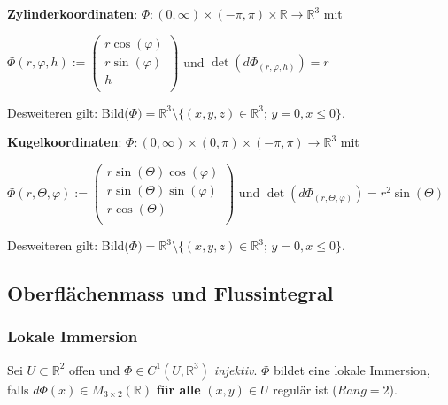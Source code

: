 \documentclass[a4paper, fontsize = 8pt, landscape]{scrartcl}
\newcommand{\R}[0]{\mathbb{R}}
\begin{document}
\begin{multicols*}{3}
    \textbf{Zylinderkoordinaten}: $\Phi: (0, \infty) \times (-\pi,\pi) \times \R \to \R^3$ mit

    \begin{center}
        $\Phi(r, \varphi, h) := \begin{pmatrix}
                r \cos(\varphi) \\ r \sin(\varphi) \\ h \\
            \end{pmatrix}$ \quad und \quad $\det(d\Phi_{(r, \varphi,h)}) = r$
    \end{center}

    Desweiteren gilt: Bild($\Phi) = \R^3 \setminus \{(x,y,z) \in \R^3; \, y = 0, x \leq 0\}$. \medskip

    \textbf{Kugelkoordinaten}: $\Phi: (0, \infty) \times (0,\pi) \times (-\pi,\pi) \to \R^3$ mit

    \begin{center}
        $\Phi(r, \Theta, \varphi) := \begin{pmatrix}
                r \sin(\Theta) \cos(\varphi) \\ r \sin(\Theta) \sin(\varphi) \\ r \cos(\Theta) \\
            \end{pmatrix}$ \quad und \quad $\det(d\Phi_{(r, \Theta, \varphi)}) = r^2 \sin(\Theta)$
    \end{center}

    Desweiteren gilt: Bild($\Phi) = \R^3 \setminus \{(x,y,z) \in \R^3; \, y = 0, x \leq 0\}$.






    \subsection{Oberflächenmass und Flussintegral}

    \subsubsection{Lokale Immersion}

    Sei $U \subset \R^2$ offen und $\Phi \in C^1(U, \R^3)$ \emph{injektiv}. $\Phi$ bildet eine lokale Immersion, falls $d\Phi(x) \in M_{3 \times 2}(\R)$ \textbf{für alle} $(x,y) \in U$ regulär ist ($Rang = 2$).


\end{multicols*}
\end{document}
